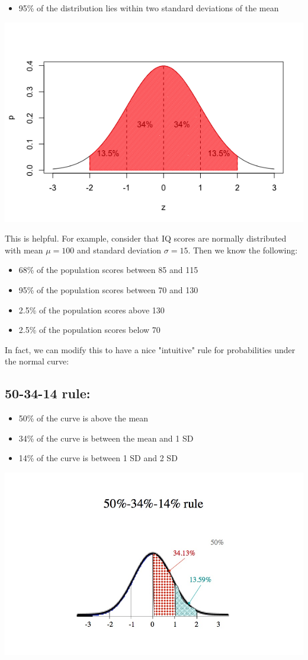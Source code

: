 \documentclass[11pt]{article}
\begin{document}
\begin{itemize}
\item 95\% of the distribution lies within two standard deviations of the mean
\end{itemize}
\includegraphics[width=.9\linewidth]{figures/week5/twoSD.png}


This is helpful.  For example, consider that IQ scores are normally distributed with mean $\mu=100$ and standard deviation $\sigma=15$.  Then we know the following:

\begin{itemize}
\item 68\% of the population scores between 85 and 115
\item 95\% of the population scores between 70 and 130
\item 2.5\% of the population scores above 130
\item 2.5\% of the population scores below 70
\end{itemize}


In fact, we can modify this to have a nice "intuitive" rule for probabilities under the normal curve:

\subsection*{50-34-14 rule:}
\label{sec-3-1}
\begin{itemize}
\item 50\% of the curve is above the mean
\item 34\% of the curve is between the mean and 1 SD
\item 14\% of the curve is between 1 SD and 2 SD
\end{itemize}

\includegraphics[width=.9\linewidth]{figures/week5/50-34-14.jpeg}
\end{document}
